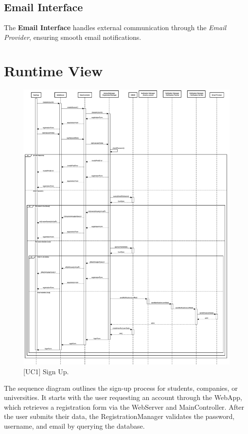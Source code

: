 \subsection{Email Interface}
The \textbf{Email Interface} handles external communication through the \textit{Email Provider}, ensuring smooth email notifications.


\section{Runtime View}
\label{sec:runtime_view}

\begin{figure}[H]
    \centering
    \includegraphics[width=\linewidth]{DD/Images/sequenceDiagrams/signUp.png}
    \caption{[UC1] Sign Up.}
    \label{fig:signUp_immagine}
\end{figure}

\clearpage
The sequence diagram outlines the sign-up process for students, companies, or universities. It starts with the user requesting an account through the WebApp, which retrieves a registration form via the WebServer and MainController. After the user submits their data, the RegistrationManager validates the password, username, and email by querying the database.

